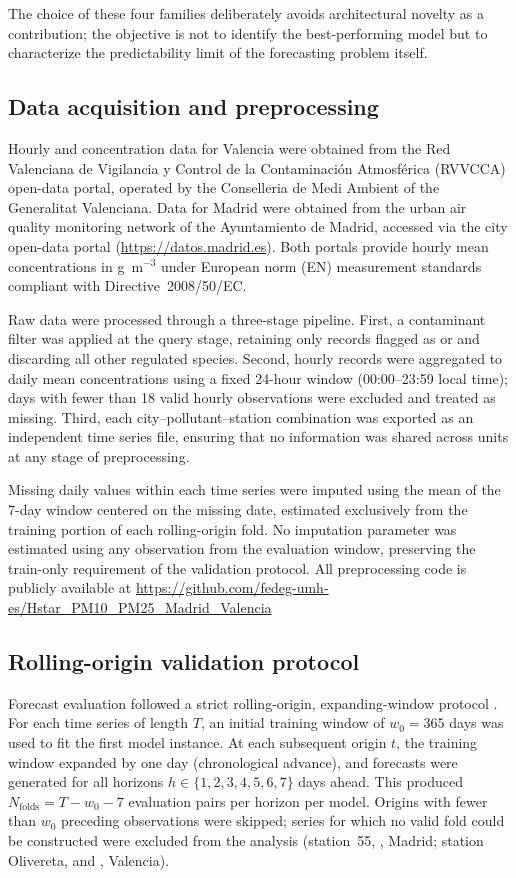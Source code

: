 \documentclass[12pt, a4paper]{article}
\begin{document}
The choice of these four families deliberately avoids
architectural novelty as a contribution; the objective
is not to identify the best-performing model but to
characterize the predictability limit of the forecasting
problem itself.

\subsection{Data acquisition and preprocessing}
Hourly  and  concentration data for Valencia
were obtained from the Red Valenciana de Vigilancia y Control de la
Contaminaci{\'o}n Atmosf{\'e}rica (RVVCCA) open-data portal,
operated by the Conselleria de Medi Ambient of the Generalitat
Valenciana.
Data for Madrid were obtained from the urban air quality monitoring
network of the Ayuntamiento de Madrid, accessed via the city
open-data portal (\url{https://datos.madrid.es}).
Both portals provide hourly mean concentrations in
\textmu g~m$^{-3}$ under European norm (EN) measurement standards
compliant with Directive~2008/50/EC.

Raw data were processed through a three-stage pipeline.
First, a contaminant filter was applied at the query stage,
retaining only records flagged as  or 
and discarding all other regulated species.
Second, hourly records were aggregated to daily mean concentrations
using a fixed 24-hour window (00:00--23:59 local time); days with
fewer than 18 valid hourly observations were excluded and treated
as missing.
Third, each city–pollutant–station combination was exported as
an independent time series file, ensuring that no information was
shared across units at any stage of preprocessing.

Missing daily values within each time series were imputed using
the mean of the 7-day window centered on the missing date,
estimated exclusively from the training portion of each
rolling-origin fold.
No imputation parameter was estimated using any observation
from the evaluation window, preserving the train-only requirement
of the validation protocol.
All preprocessing code is publicly available at
\url{https://github.com/fedeg-umh-es/Hstar_PM10_PM25_Madrid_Valencia}

\subsection{Rolling-origin validation protocol}
Forecast evaluation followed a strict rolling-origin,
expanding-window protocol \citep{Tashman2000, Cerqueira2020}.
For each time series of length $T$, an initial training window
of $w_0 = 365$ days was used to fit the first model instance.
At each subsequent origin $t$, the training window expanded by
one day (chronological advance), and forecasts were generated
for all horizons $h \in \{1, 2, 3, 4, 5, 6, 7\}$ days ahead.
This produced $N_{\mathrm{folds}} = T - w_0 - 7$ evaluation
pairs per horizon per model.
Origins with fewer than $w_0$ preceding observations were
skipped; series for which no valid fold could be constructed
were excluded from the analysis (station~55, ,
Madrid; station Olivereta,  and ,
Valencia).
\end{document}
